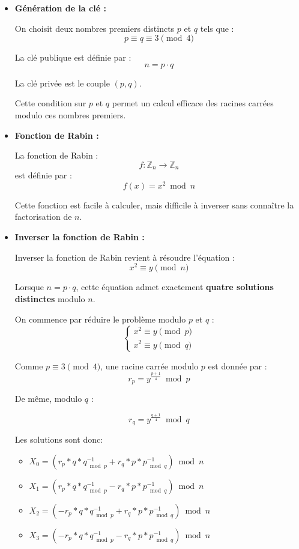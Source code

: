 \documentclass[9pt]{extarticle}
\begin{document}
\begin{itemize}
\item\textbf{Génération de la clé :}

On choisit deux nombres premiers distincts $p$ et $q$ tels que :
\[
p \equiv q \equiv 3 \pmod{4}
\]

La clé publique est définie par :
\[
n = p \cdot q
\]

La clé privée est le couple $(p, q)$.

Cette condition sur $p$ et $q$ permet un calcul efficace des racines carrées modulo ces nombres premiers.\\

\item\textbf{Fonction de Rabin :}

La fonction de Rabin :
\[
f : \mathbb{Z}_n \rightarrow \mathbb{Z}_n
\]
est définie par :
\[
f(x) = x^2 \bmod n
\]

Cette fonction est facile à calculer, mais difficile à inverser sans connaître la factorisation de $n$.\\

\item\textbf{Inverser la fonction de Rabin :}

Inverser la fonction de Rabin revient à résoudre l'équation :
\[
x^2 \equiv y \pmod{n}
\]

Lorsque $n = p \cdot q$, cette équation admet exactement \textbf{quatre solutions distinctes} modulo $n$.


On commence par réduire le problème modulo $p$ et $q$ :
\[
\begin{cases}
x^2 \equiv y \pmod{p} \\
x^2 \equiv y \pmod{q}
\end{cases}
\]

Comme $p \equiv 3 \pmod{4}$, une racine carrée modulo $p$ est donnée par :
\[
r_p = y^{\frac{p+1}{4}} \bmod p
\]

De même, modulo $q$ :

\[
r_q = y^{\frac{q+1}{4}} \bmod q
\]

Les solutions sont donc: 

\begin{itemize}
  \item $X_0 = (r_p * q * q^{-1}_{\bmod p} + r_q * p * p^{-1}_{\bmod q}) \bmod n $

  \item $X_1 = (r_p * q * q^{-1}_{\bmod p} - r_q * p * p^{-1}_{\bmod q}) \bmod n$

  \item $X_2 = (-r_p * q * q^{-1}_{\bmod p} + r_q * p * p^{-1}_{\bmod q}) \bmod n$

  \item $X_3 = (-r_p * q * q^{-1}_{\bmod p} - r_q * p * p^{-1}_{\bmod q}) \bmod n$
\end{itemize}


\end{itemize}
\end{document}
